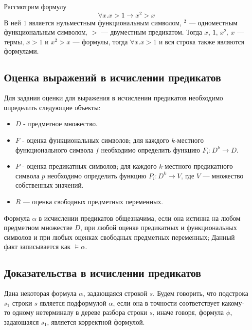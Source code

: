 \documentclass[12pt,a4paper,oneside]{article}
\begin{document}
\begin{example}
Рассмотрим формулу $$\forall x. x > 1 \rightarrow x^2 > x$$ В ней $1$ является нульместным функциональным символом, $^2$ --- одноместным функциональным символом, $>$ --- двуместным предикатом. Тогда $x$, $1$, $x^2$, $x$ --- термы, $x > 1$ и $x^2 > x$ --- формулы, тогда $\forall x. x > 1$ и вся строка также являются формулами.
\end{example}

\subsection{Оценка выражений в исчислении предикатов}

Для задания оценки для выражения в исчислении предикатов необходимо определить следующие объекты:
\begin{itemize}
    \item $D$ - предметное множество.
    \item $F$ - оценка функциональных символов; для каждого $k$-местного функционального символа $f$ необходимо определить функцию $F_i: D^k \rightarrow D$.
    \item $P$ - оценка предикатных символов; для каждого $k$-местного предикатного символа $p$ необходимо определить функцию $P_i: D^k \rightarrow V$, где $V$ --- множество собственных значений.
    \item $R$ --- оценка свободных предметных переменных.
\end{itemize}

\begin{definition}Формула $\alpha$ в исчислении предикатов общезначима, если она
истинна на любом предметном множестве $D$, при любой оценке предикатных
и функциональных символов и при любых оценках свободных предметных
переменных; Данный факт записывается как $\models \alpha$.
\end{definition}


\subsection{Доказательства в исчислении предикатов}

\begin{definition}Дана некоторая формула $\alpha$, задающаяся строкой $s$.
Будем говорить, что подстрока $s_1$ строки $s$ является подформулой $\alpha$, 
если она в точности соответствует какому-то одному нетерминалу
в дереве разбора строки $s$, иначе говоря, формула $\phi$, задающаяся $s_1$, является корректной формулой.
\end{definition}
\end{document}
